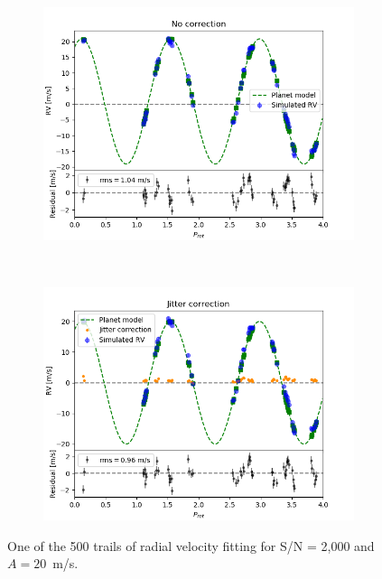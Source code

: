 \begin{figure}[htbp]	
    \begin{subfigure}[b]{0.49\textwidth}
        \includegraphics[width=\textwidth]{./Figures/Methods/Fitting_5-Fit2_a20.png}
    \end{subfigure}
	~
    \begin{subfigure}[b]{0.49\textwidth}
        \includegraphics[width=\textwidth]{./Figures/Methods/Fitting_5-Fit1_XYZ_a20.png}
    \end{subfigure}	
    \caption[Planet recovery ($A = 20$~m/s)]
    {One of the 500 trails of radial velocity fitting for S/N = 2,000 and $A = 20$~m/s.}
\label{fig:Planet_recovery_a20_p20}
\end{figure}    

